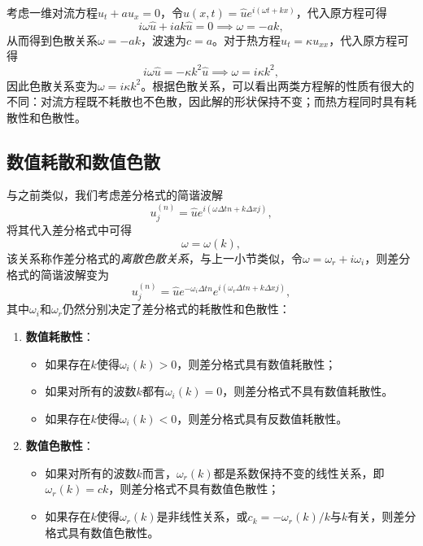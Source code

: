 \documentclass[a4paper,10pt]{ctexart}
\begin{document}
\begin{example}
    考虑一维对流方程$ u_t+au_x=0 $，令$ u(x,t) = \hat{u} e^{i(\omega t + kx)} $，代入原方程可得
    \[
        i\omega \hat{u} + iak\hat{u} = 0 \implies \omega = -ak,
    \]
    从而得到色散关系$ \omega = -ak $，波速为$ c=a $。对于热方程$ u_t = \kappa u_{xx} $，代入原方程可得
    \[
        i\omega \hat{u} = -\kappa k^2 \hat{u} \implies \omega = i\kappa k^2,
    \]
    因此色散关系变为$ \omega = i\kappa k^2 $。根据色散关系，可以看出两类方程解的性质有很大的不同：对流方程既不耗散也不色散，因此解的形状保持不变；而热方程同时具有耗散性和色散性。
\end{example}

\subsection{数值耗散和数值色散}
与之前类似，我们考虑差分格式的简谐波解
\begin{equation}
    u^{(n)}_j = \hat{u} e^{i(\omega \Delta t n + k\Delta x j)},
\end{equation}
将其代入差分格式中可得
\[
    \omega = \omega(k),
\]
该关系称作差分格式的\emph{离散色散关系}，与上一小节类似，令$ \omega = \omega_r + i\omega_i $，则差分格式的简谐波解变为
\[
    u^{(n)}_j = \hat{u} e^{-\omega_i \Delta t n} e^{i(\omega_r \Delta t n + k\Delta x j)},
\]
其中$ \omega_i $和$ \omega_r $仍然分别决定了差分格式的耗散性和色散性：
\begin{enumerate}
    \item \textbf{数值耗散性}：
    \begin{itemize}
        \item 如果存在$ k $使得$ \omega_i(k)>0 $，则差分格式具有数值耗散性；
        \item 如果对所有的波数$ k $都有$ \omega_i(k)=0 $，则差分格式不具有数值耗散性。
        \item 如果存在$ k $使得$ \omega_i(k)<0 $，则差分格式具有反数值耗散性。
    \end{itemize}
    \item \textbf{数值色散性}：
    \begin{itemize}
        \item 如果对所有的波数$ k $而言，$ \omega_r(k) $都是系数保持不变的线性关系，即$ \omega_r(k) = ck $，则差分格式不具有数值色散性；
        \item 如果存在$ k $使得$ \omega_r(k) $是非线性关系，或$ c_k=-\omega_r(k) / k $与$ k $有关，则差分格式具有数值色散性。
    \end{itemize}
\end{enumerate}
\end{document}
